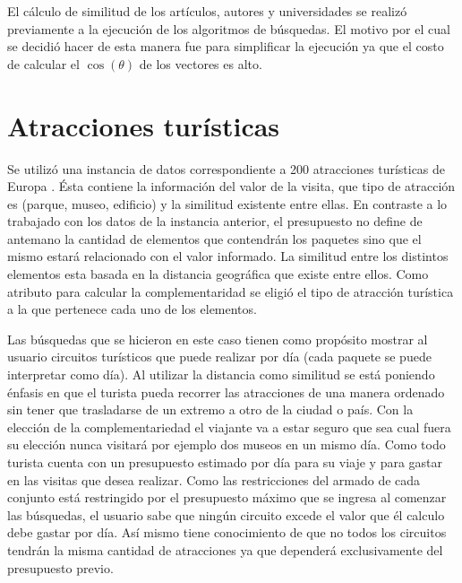 El cálculo de similitud de los artículos, autores y universidades se realizó previamente a la ejecución de los algoritmos de búsquedas. El motivo por el cual se decidió hacer de esta manera fue para simplificar la ejecución ya que el costo de calcular el $\cos(\theta)$ de los vectores es alto.
\section{Atracciones turísticas}
Se utilizó una instancia de datos correspondiente a 200 atracciones turísticas de Europa \cite{turisticAtraction}. Ésta contiene la información del valor de la visita, que tipo de atracción es (parque, museo, edificio) y la similitud existente entre ellas. En contraste a lo trabajado con los datos de la instancia anterior, el presupuesto no define de antemano la cantidad de elementos que contendrán los paquetes sino que el mismo estará relacionado con el valor informado. La similitud entre los distintos elementos esta basada en la distancia geográfica que existe entre ellos. Como atributo para calcular la complementaridad se eligió el tipo de atracción turística a la que pertenece cada uno de los elementos.

Las búsquedas que se hicieron en este caso tienen como propósito mostrar al usuario circuitos turísticos que puede realizar por día (cada paquete se puede interpretar como día). Al utilizar la distancia como similitud se está poniendo énfasis en que el turista pueda recorrer las atracciones de una manera ordenado sin tener que trasladarse de un extremo a otro de la ciudad o país. Con la elección de la complementariedad el viajante va a estar seguro que sea cual fuera su elección nunca visitará por ejemplo dos museos en un mismo día. Como todo turista cuenta con un presupuesto estimado por día para su viaje y para gastar en las visitas que desea realizar. Como las restricciones del armado de cada conjunto está restringido por el presupuesto máximo que se ingresa al comenzar las búsquedas, el usuario sabe que ningún circuito excede el valor que él calculo debe gastar por día. Así mismo tiene conocimiento de que no todos los circuitos tendrán la misma cantidad de atracciones ya que dependerá exclusivamente del presupuesto previo.
